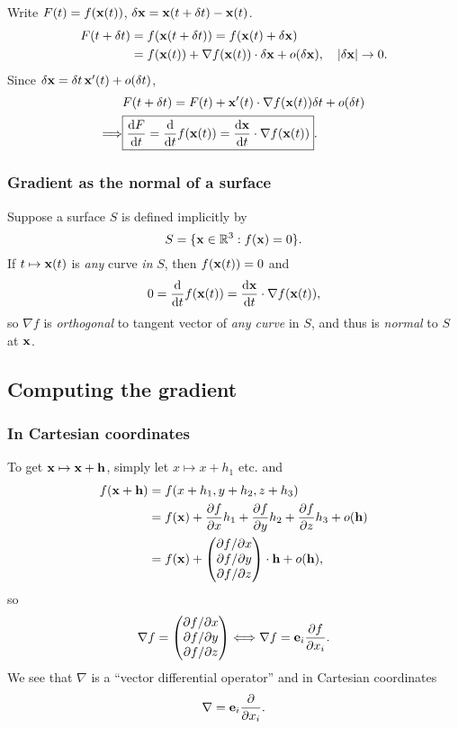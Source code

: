 Write $ F(t) = f({\bf x}(t)) $, $ \delta{\bf x} = {\bf x}(t+\delta t)-{\bf x}(t) $.
\begin{align*}
    F(t+\delta t) &= f({\bf x}(t+\delta t)) = f({\bf x}(t)+\delta {\bf x})\\ 
    &= f({\bf x}(t))+\nabla f({\bf x}(t)) \cdot \delta{\bf x} +o(\delta {\bf x}),\quad |\delta{\bf x}| \to 0.
\end{align*}
Since $ \delta{\bf x} = \delta t\, {\bf x}'(t)+o(\delta t) $, 
\begin{align*}
    &F(t+\delta t)= F(t)+{\bf x}'(t) \cdot \nabla f({\bf x}(t)) \delta t+o(\delta t)\\ 
    \Longrightarrow & \boxed{\frac{\mathrm{d}F}{\mathrm{d}t} = \frac{\mathrm{d}}{\mathrm{d}t}f({\bf x}(t)) = \frac{\mathrm{d}{\bf x}}{\mathrm{d}t} \cdot \nabla f({\bf x}(t))}.
\end{align*}

\subsubsection{Gradient as the normal of a surface}
Suppose a surface $S$ is defined implicitly by 
\[
    S = \{{\bf x}\in \mathbb{R}^{3}: f({\bf x})=0\}.
\]
If $ t \mapsto {\bf x}(t) $ is \textit{any} curve \textit{in} $S$, then $ f({\bf x}(t))=0 $ and 
\[
    0 = \frac{\mathrm{d}}{\mathrm{d}t}f({\bf x}(t)) =  \frac{\mathrm{d}{\bf x}}{\mathrm{d}t} \cdot \nabla f({\bf x}(t)),
\]
so $ \nabla f $ is \textit{orthogonal} to tangent vector of \textit{any curve} in $S$, and thus is \textit{normal} to $S$ at $ {\bf x} $.

\subsection{Computing the gradient}
\subsubsection{In Cartesian coordinates}
To get $ {\bf x} \mapsto {\bf x}+{\bf h} $, simply let $ x \mapsto x+h_1 $ etc. and 
\begin{align*}
    f({\bf x}+{\bf h}) &= f(x+h_1,y+h_2,z+h_3)\\ 
    &= f({\bf x}) + \frac{\partial f}{\partial x}h_1+\frac{\partial f}{\partial y}h_2+\frac{\partial f}{\partial z}h_3 +o({\bf h})\\ 
    &= f({\bf x})+ \begin{pmatrix}
        \partial f/\partial x  \\ \partial f/\partial y  \\ \partial f/\partial z 
    \end{pmatrix}\cdot {\bf h}+o({\bf h}),
\end{align*}
so 
\[
    \nabla f = \begin{pmatrix}
        \partial f/\partial x  \\ \partial f/\partial y  \\ \partial f/\partial z 
    \end{pmatrix} \Longleftrightarrow \nabla f = {\bf e}_i \frac{\partial f}{\partial x_i}.
\]
We see that $ \nabla $ is a ``vector differential operator'' and in Cartesian coordinates
\[
    \nabla = {\bf e}_i \frac{\partial }{\partial x_i} . 
\]

